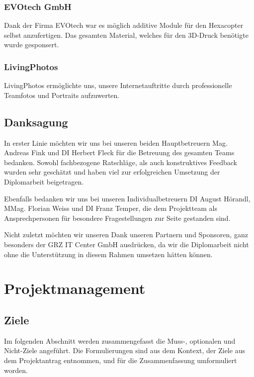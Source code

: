 \subsection*{EVOtech GmbH}
Dank der Firma {EVOtech\cite{evotech}} war es möglich additive Module für den Hexacopter selbst anzufertigen.
Das gesamten Material, welches für den 3D-Druck benötigte wurde gesponsert.

\subsection*{LivingPhotos}
LivingPhotos ermöglichte uns, unsere Internetauftritte durch professionelle Teamfotos und Portraits aufzuwerten.

\section{Danksagung}
In erster Linie möchten wir uns bei unseren beiden Hauptbetreuern Mag. Andreas Fink und DI Herbert Fleck für die
Betreuung des gesamten Teams bedanken. Sowohl fachbezogene Ratschläge, als auch konstruktives Feedback wurden sehr
geschätzt und haben viel zur erfolgreichen Umsetzung der Diplomarbeit beigetragen.

Ebenfalls bedanken wir uns bei unseren Individualbetreuern DI August Hörandl, MMag. Florian Weiss und
DI Franz Temper, die dem Projektteam als Ansprechpersonen für besondere Fragestellungen zur Seite gestanden
sind.

Nicht zuletzt möchten wir unseren Dank unseren Partnern und Sponsoren, ganz besonders der GRZ IT Center GmbH
ausdrücken, da wir die Diplomarbeit nicht ohne die Unterstützung in diesem Rahmen umsetzen hätten können.

\chapter{Projektmanagement}
\renewcommand{\kapitelautor}{Autor: Markus Kaiser}

\section{Ziele}
Im folgenden Abschnitt werden zusammengefasst die Muss-, optionalen und Nicht-Ziele angeführt.
Die Formulierungen sind aus dem Kontext, der Ziele aus dem Projektantrag entnommen, und für die
Zusammenfassung umformuliert worden.


